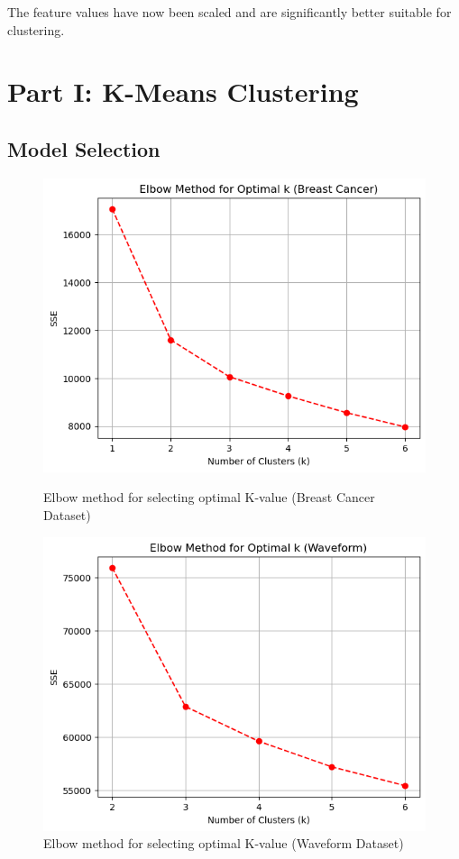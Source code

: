 \documentclass{article}
\begin{document}
The feature values have now been scaled and are significantly better suitable for clustering. 

\newpage

\section{Part I: K-Means Clustering}
\subsection{Model Selection}
\begin{figure}[H]
    \centering
    \begin{minipage}[b]{0.49\textwidth}
        \centering
        \includegraphics[width=\textwidth]{elbow_cancer.png}
        \caption{Elbow method for selecting optimal K-value (Breast Cancer Dataset)}
    \end{minipage}
    \hfill
    \begin{minipage}[b]{0.49\textwidth}
        \centering
        \includegraphics[width=\textwidth]{elbow_waveform.png}
        \caption{Elbow method for selecting optimal K-value (Waveform Dataset)}
    \end{minipage}
\end{figure}
\end{document}
